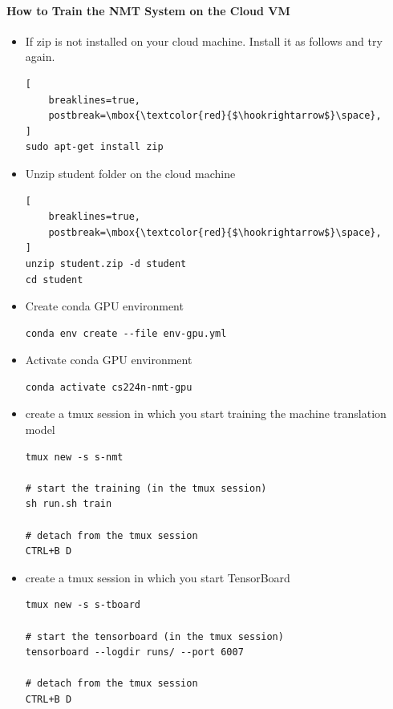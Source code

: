 \paragraph{How to Train the NMT System on the Cloud VM}
\begin{itemize}
\item If zip is not installed on your cloud machine. Install it as follows and try again.
\begin{lstlisting}[
    breaklines=true,
    postbreak=\mbox{\textcolor{red}{$\hookrightarrow$}\space},
]
sudo apt-get install zip
\end{lstlisting}

    \item Unzip student folder on the cloud machine
\begin{lstlisting}[
    breaklines=true,
    postbreak=\mbox{\textcolor{red}{$\hookrightarrow$}\space},
]
unzip student.zip -d student
cd student
\end{lstlisting}

    \item Create conda GPU environment
\begin{lstlisting}
conda env create --file env-gpu.yml
\end{lstlisting}

    \item Activate conda GPU environment
\begin{lstlisting}
conda activate cs224n-nmt-gpu    
\end{lstlisting}

    \item create a tmux session in which you start training the machine translation model
    
\begin{lstlisting}
tmux new -s s-nmt

# start the training (in the tmux session)
sh run.sh train

# detach from the tmux session
CTRL+B D
\end{lstlisting}

    \item create a tmux session in which you start TensorBoard

\begin{lstlisting}
tmux new -s s-tboard

# start the tensorboard (in the tmux session)
tensorboard --logdir runs/ --port 6007

# detach from the tmux session
CTRL+B D
\end{lstlisting}


\end{itemize}
